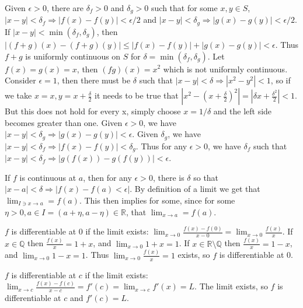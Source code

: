 \documentclass{homework}
\begin{document}
\maketitle


\question
\begin{alphaparts}
	\questionpart {} Given $\epsilon > 0$, there are $\delta_f > 0$ and $\delta_g > 0$ such that for some $x, y \in S$, $|x-y| < \delta_f \Rightarrow |f(x) - f(y)| < \epsilon/2$ and $|x-y| < \delta_g \Rightarrow |g(x) - g(y)| < \epsilon/2$. If $|x-y| < \min(\delta_f, \delta_g)$, then $|(f+g)(x) - (f+g)(y)| \le |f(x) - f(y)| + |g(x) - g(y)| < \epsilon$. Thus $f+g$ is uniformly continuous on $S$ for $\delta = \min(\delta_f, \delta_g)$.
	\questionpart {} Let $f(x) = g(x) = x$, then $(fg)(x) = x^2$ which is not uniformly continuous. Consider $\epsilon = 1$, then there must be $\delta$ such that $|x - y| < \delta \Rightarrow |x^2 - y^2| < 1$, so if we take $x = x, y = x+\frac{\delta}{2}$ it needs to be true that $|x^2 - (x+\frac{\delta}{2})^2| = |\delta x + \frac{\delta^2}{2}| < 1$. But this does not hold for every x, simply choose $x = 1/\delta$ and the left side becomes greater than one.
	\questionpart {} Given $\epsilon > 0$, we have $|x-y| < \delta_g \Rightarrow |g(x)-g(y)| < \epsilon$. Given $\delta_g$, we have $|x-y| < \delta_f \Rightarrow |f(x) - f(y)| < \delta_g$. Thus for any $\epsilon > 0$, we have $\delta_f$ such that $|x-y| < \delta_f \Rightarrow |g(f(x)) - g(f(y))| < \epsilon$. 
\end{alphaparts}


\question


\question
If $f$ is continuous at $a$, then for any $\epsilon > 0$, there is $\delta$ so that $|x - a| < \delta \Rightarrow |f(x) - f(a) < \epsilon|$. By definition of a limit we get that $\lim_{I \ni x \to a} = f(a)$. This then implies for some, since for some $\eta > 0, a \in I = (a + \eta, a - \eta) \in \mathbb{R}$, that $\lim_{x \to a} = f(a)$.


\question
$f$ is differentiable at 0 if the limit exists: $\lim_{x \to 0} \frac{f(x) - f(0)}{x - 0} =	\lim_{x \to 0}	\frac{f(x)}{x}$. If $x \in \mathbb{Q}$ then $\frac{f(x)}{x} = 1+x$, and $\lim_{x \to 0} 1+x = 1$. If $x \in \mathbb{R} \setminus \mathbb{Q}$ then $\frac{f(x)}{x} = 1-x$, and $\lim_{x \to 0} 1-x = 1$. Thus $\lim_{x \to 0} \frac{f(x)}{x} = 1$ exists, so $f$ is differentiable at 0.


\question
$f$ is differentiable at $c$ if the limit exists:  $\lim_{x \to c} \frac{f(x) - f(c)}{x - c} = f'(c) = \lim_{x \to c} f'(x) = L$. The limit exists, so $f$ is differentiable at $c$ and $f'(c) = L$.
\end{document}
